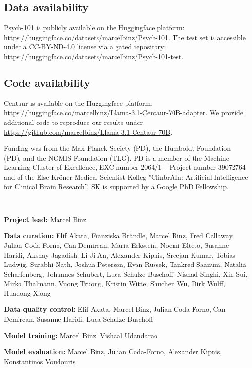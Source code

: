 \documentclass[pdflatex,sn-nature]{sn-jnl}%
\theoremstyle{thmstyleone}%
\theoremstyle{thmstyletwo}%
\theoremstyle{thmstylethree}%
\begin{document}
\subsection*{Data availability}

Psych-101 is publicly available on the Huggingface platform: \url{https://huggingface.co/datasets/marcelbinz/Psych-101}. The test set is accessible under a CC-BY-ND-4.0 license via a gated repository: \url{https://huggingface.co/datasets/marcelbinz/Psych-101-test}. 

\subsection*{Code availability}
Centaur is available on the Huggingface platform: \url{https://huggingface.co/marcelbinz/Llama-3.1-Centaur-70B-adapter}. We provide additional code to reproduce our results under \url{https://github.com/marcelbinz/Llama-3.1-Centaur-70B}.
 
\backmatter


Funding was from the Max Planck Society (PD), the Humboldt Foundation (PD), and the NOMIS Foundation (TLG). PD is a member of the Machine Learning Cluster of Excellence, EXC number 2064/1 – Project number 39072764 and of the Else Kr\"oner Medical Scientist Kolleg "ClinbrAIn: Artificial Intelligence for Clinical Brain
Research”. SK is supported by a Google PhD Fellowship.


 $~$

\noindent\textbf{Project lead:} Marcel Binz

\noindent\textbf{Data curation:} Elif Akata, Franziska Brändle, Marcel Binz, Fred Callaway, Julian Coda-Forno, Can Demircan, Maria Eckstein, Noemi Elteto, Susanne Haridi, Akshay Jagadish, Li Ji-An, Alexander Kipnis, Sreejan Kumar, Tobias Ludwig, Surabhi Nath, Joshua Peterson, Evan Russek, Tankred Saanum, Natalia Scharfenberg, Johannes Schubert, Luca Schulze Buschoff, Nishad Singhi, Xin Sui, Mirko Thalmann, Vuong Truong, Kristin Witte, Shuchen Wu, Dirk Wulff, Huadong Xiong

\noindent\textbf{Data quality control:} Elif Akata, Marcel Binz, Julian Coda-Forno, Can Demircan, Susanne Haridi, Luca Schulze Buschoff

\noindent\textbf{Model training:} Marcel Binz, Vishaal Udandarao

\noindent\textbf{Model evaluation:} Marcel Binz, Julian Coda-Forno, Alexander Kipnis, Konstantinos Voudouris 
\end{document}
